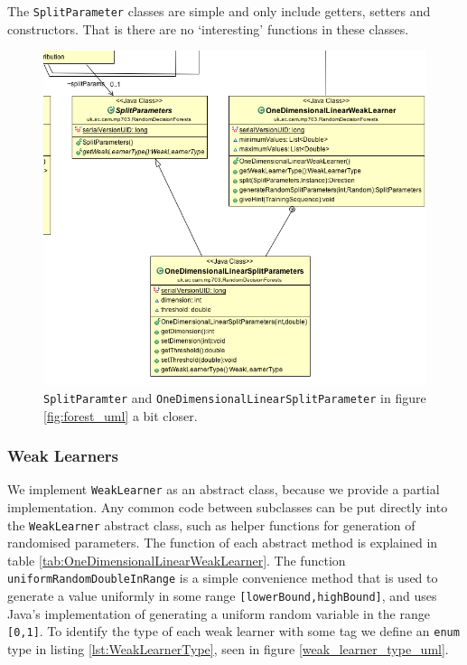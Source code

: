 \documentclass[12pt,twoside,notitlepage]{report}
\begin{document}
                The \texttt{SplitParameter} classes are simple and only include getters, setters and constructors. That 
                is there are no `interesting' functions in these classes.

                \begin{figure}[H]
                    \centering
                    \includegraphics[scale=0.5]{SplitParam_Forest_UML}
                    \caption{\texttt{SplitParamter} and \texttt{OneDimensionalLinearSplitParameter} in figure 
                    \ref{fig:forest_uml} a bit closer.}
                    \label{fig:split_param_uml}
                \end{figure}




            \subsubsection{Weak Learners} \label{sec:weak_learner}
                We implement \texttt{WeakLearner} as an abstract class, because we provide a partial 
                implementation. Any common code between subclasses can be put directly into the \texttt{WeakLearner} 
                abstract class, such as helper functions for generation of randomised parameters. The function of each 
                abstract method is explained in table \ref{tab:OneDimensionalLinearWeakLearner}. The function 
                \texttt{uniformRandomDoubleInRange} is a simple convenience method that is used to generate a value 
                uniformly in some range \texttt{[lowerBound,highBound]}, 
                and uses Java's implementation of generating a uniform random variable in the range \texttt{[0,1]}. To 
                identify the type of each weak learner with some tag we define an \texttt{enum} type in listing 
                \ref{lst:WeakLearnerType}, seen in figure \ref{weak_learner_type_uml}. 
\end{document}
